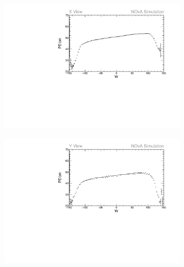 \begin{figure}[h]
\centering
\begin{subfigure}[b]{0.495\textwidth}
\centering
\includegraphics[width=\textwidth]{Plots/TBCalibration/Attenprofs_Simulation_WPE_corr_xy_X_Prof.pdf}
\end{subfigure}
\begin{subfigure}[b]{0.495\textwidth}
\centering
\includegraphics[width=\textwidth]{Plots/TBCalibration/Attenprofs_Simulation_WPE_corr_xy_Y_Prof.pdf}
\end{subfigure}
\begin{subfigure}[b]{0.495\textwidth}
\centering

\end{subfigure}
\end{figure}
